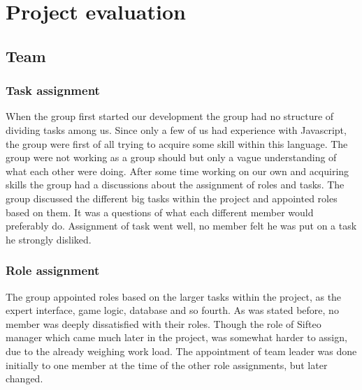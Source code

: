 \chapter{Project evaluation}

\section{Team}

\subsection*{Task assignment}
When the group first started our development the group had no structure of dividing tasks among us. Since only a few of us had experience with Javascript, the group were first of all trying to acquire some skill within this language. The group were not working as a group should but only a vague understanding of what each other were doing. After some time working on our own and acquiring skills the group had a discussions about the assignment of roles and tasks. The group discussed the different big tasks within the project and appointed roles based on them. It was a questions of what each different member would preferably do. Assignment of task went well, no member felt he was put on a task he strongly disliked.

\subsection*{Role assignment}

The group appointed roles based on the larger tasks within the project, as the expert interface, game logic, database and so fourth. As was stated before, no member was deeply dissatisfied with their roles. Though the role of Sifteo manager which came much later in the project, was somewhat harder to assign, due to the already weighing work load. The appointment of team leader was done initially to one member at the time of the other role assignments, but later changed. 

